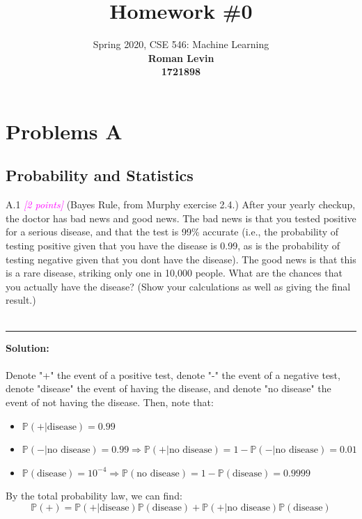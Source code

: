 \documentclass{article}
\date{{}}
\newcommand{\1}{\mathbf{1}}
\newcommand{\points}[1]{\small\textcolor{magenta}{\emph{[#1 points]}} \normalsize}
\begin{document}
\title{Homework \#0}
\author{\normalsize{Spring 2020, CSE 546: Machine Learning}\\
\normalsize{\bf Roman Levin} \\
\normalsize{\bf 1721898} \\
}
\maketitle

\section*{Problems A}
\subsection*{Probability and Statistics}
A.1 \points{2} (Bayes Rule, from Murphy exercise 2.4.) After your yearly checkup, the doctor has bad news and good news. The bad news is that you tested positive for a serious disease, and that the test is 99\% accurate (i.e., the probability of testing positive given that you have the disease is 0.99, as is the probability of testing negative given that you dont have the disease). The good news is that this is a rare disease, striking only one in 10,000 people. What are the chances that you actually have the disease? (Show your calculations as well as giving the final result.)\\
\\
\noindent\rule{\textwidth}{1pt}
{\bf Solution:}\\
\\
Denote "+" the event of a positive test, denote "-" the event of a negative test, denote "disease" the event of having the disease, and denote "no disease" the event of not having the disease. Then, note that:
\begin{itemize}
    \item $\mathbb{P}(+\vert \text{disease}) = 0.99$
    \item $\mathbb{P}(-\vert \text{no disease}) = 0.99 \Rightarrow \mathbb{P}(+\vert \text{no disease}) = 1 - \mathbb{P}(-\vert \text{no disease}) = 0.01$
    \item $\mathbb{P}(\text{disease}) = 10^{-4} \Rightarrow \mathbb{P}(\text{no disease}) = 1 - \mathbb{P}(\text{disease}) = 0.9999$ 
\end{itemize}
By the total probability law, we can find:
\begin{equation}\label{+}
    \mathbb{P}(+) = \mathbb{P}(+\vert \text{disease})\mathbb{P}(\text{disease}) +  \mathbb{P}(+\vert \text{no disease})\mathbb{P}(\text{disease})  
\end{equation}
\end{document}
